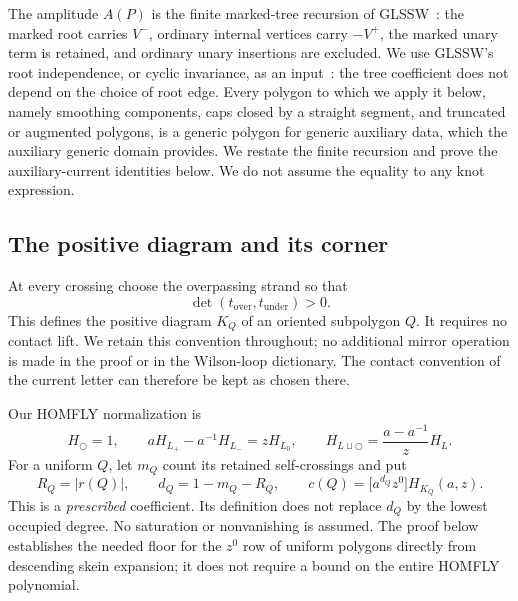 \documentclass[11pt,letterpaper]{article}
\numberwithin{equation}{section}
\theoremstyle{definition}
\theoremstyle{remark}
\newcommand{\coeff}[1]{\bigl[#1\bigr]}
\begin{document}
The amplitude \(A(P)\) is the finite marked-tree recursion of
GLSSW~\cite{GLSSW}: the marked root carries \(V^-\), ordinary internal
vertices carry \(-V^+\), the marked unary term is retained, and ordinary
unary insertions are excluded. We use GLSSW's root independence, or
cyclic invariance, as an input~\cite{GLSSW}: the tree coefficient does
not depend on the choice of root edge. Every polygon to which we apply
it below, namely smoothing components, caps closed by a straight segment,
and truncated or augmented polygons, is a generic polygon for generic
auxiliary data, which the auxiliary generic domain provides. We restate
the finite recursion and prove the auxiliary-current identities below.
We do not assume the equality to any knot expression.

\subsection{The positive diagram and its corner}

At every crossing choose the overpassing strand so that
\begin{equation}
 \det(t_{\mathrm{over}},t_{\mathrm{under}})>0.
 \label{eq:positive-diagram}
\end{equation}
This defines the positive diagram \(K_Q\) of an oriented subpolygon \(Q\).
It requires no contact lift. We retain this convention throughout; no
additional mirror operation is made in the proof or in the Wilson-loop
dictionary. The contact convention of the current letter can therefore be
kept as chosen there.

Our HOMFLY normalization is
\begin{equation}
 H_{\bigcirc}=1,
 \qquad aH_{L_+}-a^{-1}H_{L_-}=zH_{L_0},
 \qquad H_{L\sqcup\bigcirc}=\frac{a-a^{-1}}{z}H_L.
 \label{eq:homfly-conventions}
\end{equation}
For a uniform \(Q\), let \(m_Q\) count its retained self-crossings and put
\begin{equation}
 R_Q=|r(Q)|,
 \qquad d_Q=1-m_Q-R_Q,
 \qquad c(Q)=\coeff{a^{d_Q}z^0}H_{K_Q}(a,z).
 \label{eq:corner-definition}
\end{equation}
This is a \emph{prescribed} coefficient. Its definition does not replace
\(d_Q\) by the lowest occupied degree. No saturation or nonvanishing is
assumed. The proof below establishes the needed floor for the \(z^0\)
row of uniform polygons directly from descending skein expansion; it does
not require a bound on the entire HOMFLY polynomial.
\end{document}
